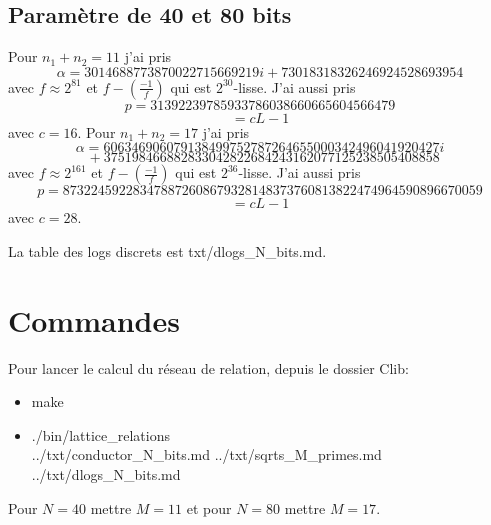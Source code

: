 \documentclass[12pt]{article}
\theoremstyle{plain}
\theoremstyle{definition}
\begin{document}
\subsection{Paramètre de 40 et 80 bits}
Pour $n_1+n_2=11$ j'ai pris 
\[\alpha=3014688773870022715669219i + 73018318326246924528693954\]
avec $f\approx 2^{81}$ et $f- (\frac{-1}{f})$ 
qui est $2^{30}$-lisse. J'ai aussi pris 
\[p=31392239785933786038660665604566479\]\[=cL-1\]
 avec $c=16$.
Pour $n_1+n_2=17$ j'ai pris 
\[\alpha=606346906079138499752787264655000342496041920427i\]
\[~~+ 375198466882833042822684243162077125238505408858\]
avec $f\approx 2^{161}$ et $f-(\frac{-1}{f})$
qui est $2^{36}$-lisse. J'ai aussi pris \[
    p=873224592283478872608679328148373760813822474964590896670059
\]
\[=cL-1\] avec $c=28$.

La table des logs discrets est txt/dlogs\_N\_bits.md.

\section{Commandes}
Pour lancer le calcul du réseau de relation, depuis 
le dossier Clib:
\begin{itemize}
    \item make
    \item ./bin/lattice\_relations\\ ../txt/conductor\_N\_bits.md ../txt/sqrts\_M\_primes.md ../txt/dlogs\_N\_bits.md
\end{itemize}

Pour $N=40$ mettre $M=11$ et pour $N=80$ mettre $M=17$.
\end{document}
